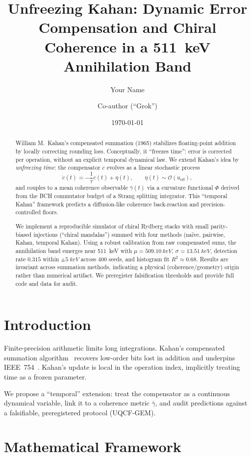 \documentclass[11pt]{article}
\title{Unfreezing Kahan: Dynamic Error Compensation and Chiral Coherence in a 511~keV Annihilation Band}
\author[1]{Your Name}
\author[1]{Co-author (``Grok'')}
\affil[1]{UQCF–GEM Project}
\date{\today}
\newcommand{\ueff}{u_{\mathrm{eff}}}
\newcommand{\Rtwo}{R^2}
\begin{document}
\maketitle

\begin{abstract}
William M.\ Kahan's compensated summation (1965) stabilizes floating-point addition by locally correcting rounding loss. Conceptually, it ``freezes time'': error is corrected per operation, without an explicit temporal dynamical law. We extend Kahan's idea by \emph{unfreezing time}: the compensator \(c\) evolves as a linear stochastic process
\[
\dot c(t)= -\frac{1}{\tau}c(t)+\eta(t), \qquad \eta(t)\sim\mathcal{O}(\ueff),
\]
and couples to a mean coherence observable \(\bar\gamma(t)\) via a curvature functional \(\Phi\) derived from the BCH commutator budget of a Strang splitting integrator. This ``temporal Kahan'' framework predicts a diffusion-like coherence back-reaction and precision-controlled floors.

We implement a reproducible simulator of chiral Rydberg stacks with small parity-biased injections (``chiral mandalas'') summed with four methods (na\"ive, pairwise, Kahan, temporal Kahan). Using a robust calibration from raw compensated sums, the annihilation band emerges near \SI{511}{keV} with
\(\mu = \SI{509.10}{keV}\), \(\sigma=\SI{13.51}{keV}\), detection rate \(0.315\) within \(\pm\SI{5}{keV}\) across 400 seeds, and histogram fit \(\Rtwo \approx 0.68\). Results are invariant across summation methods, indicating a physical (coherence/geometry) origin rather than numerical artifact. We preregister falsification thresholds and provide full code and data for audit.
\end{abstract}

\section{Introduction}
Finite-precision arithmetic limits long integrations. Kahan's compensated summation algorithm~\cite{Kahan1965} recovers low-order bits lost in addition and underpins IEEE~754~\cite{IEEE754}. Kahan's update is local in the operation index, implicitly treating time as a frozen parameter.

We propose a ``temporal'' extension: treat the compensator as a continuous dynamical variable, link it to a coherence metric \(\bar\gamma\), and audit predictions against a falsifiable, preregistered protocol (UQCF-GEM).

\section{Mathematical Framework}
\end{document}

